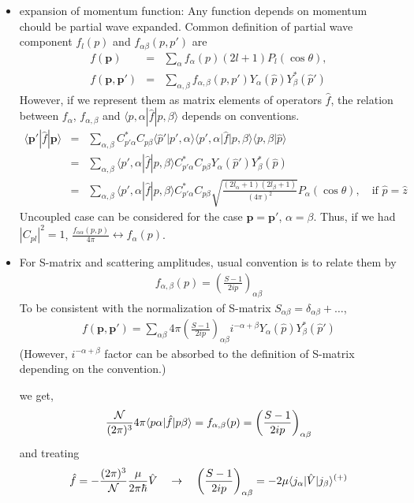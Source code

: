 \documentclass[10pt]{book}
\def\bm{\boldsymbol}
\newcommand{\bea}{\begin{eqnarray}}
\newcommand{\eea}{\end{eqnarray}}
\newcommand{\no}{\nonumber \\}
\def\vp{{\bm p}}
\def\la{\langle}
\def\ra{\rangle}
\begin{document}
\begin{itemize}
\item expansion of momentum function: Any function depends on momentum chould be partial wave expanded.
      Common definition of partial wave component $f_l(p)$ and $f_{\alpha\beta}(p,p')$ are
      \bea 
      f(\vp)&=&\sum_{\alpha} f_{\alpha}(p) (2l+1) P_l(\cos\theta) ,\no
      f(\vp,\vp')&=&\sum_{\alpha,\beta} f_{\alpha,\beta}(p,p') Y_\alpha(\hat{p}) Y^*_\beta(\hat{p}')   
      \eea 
      However, if we represent them as matrix elements of operators $\hat{f}$, 
      the relation between $f_{\alpha}$, $f_{\alpha,\beta}$ and $\la p,\alpha|\hat{f}|p,\beta\ra $
      depends on conventions.
      \bea 
      \la \vp'|\hat{f}|\vp\ra 
      &=&\sum_{\alpha,\beta} C^*_{p'\alpha} C_{p\beta}\la \hat{p}'|p',\alpha\ra\la p',\alpha|
                           \hat{f}|p,\beta\ra \la p,\beta|\hat{p}\ra \no 
      &=&\sum_{\alpha,\beta} \la p',\alpha|
                                 \hat{f}|p,\beta\ra 
                                C^*_{p'\alpha} C_{p\beta} 
                          Y_\alpha(\hat{p}') Y^*_{\beta}(\hat{p})\no
      &=&\sum_{\alpha,\beta} \la p',\alpha|
                                 \hat{f}|p,\beta\ra 
                                C^*_{p'\alpha} C_{p\beta} 
                          \sqrt{\frac{(2l_\alpha+1)(2l_\beta+1)}{(4\pi)^2}}
                          P_\alpha(\cos\theta),\quad \mbox{if }\hat{p}=\hat{z}
      \eea 
      Uncoupled case can be considered for the case $\vp=\vp'$, $\alpha=\beta$.
      Thus, if we had $|C_{pl}|^2=1$, 
      $\frac{f_{\alpha\alpha}(p,p)}{4\pi}\leftrightarrow f_\alpha(p)$.
      
      \item For S-matrix and scattering amplitudes, usual convention is to relate them by
      \bea 
      f_{\alpha,\beta}(p)=\left(\frac{S-1}{2ip}\right)_{\alpha\beta}
      \eea 
      To be consistent with the normalization of S-matrix $S_{\alpha\beta}=\delta_{\alpha\beta}+\dots$,
      \bea 
      \boxed{ 
      f(\vp, \vp')=\sum_{\alpha\beta} 4\pi
       \left(\frac{S-1}{2ip}\right)_{\alpha\beta}
      i^{-\alpha+\beta}
      Y_{\alpha}(\hat{p})Y_{\beta}^*(\hat{p}') }
      \eea 
      (However, $i^{-\alpha+\beta}$ factor can be absorbed to the 
      definition of S-matrix depending on the convention.)
      
      we get,
      \bea 
      \frac{\cal N}{(2\pi)^3} 4\pi \la p \alpha |\hat{f}|p \beta \ra 
      =f_{\alpha,\beta}(p)=\left(\frac{S-1}{2ip}\right)_{\alpha\beta}
      \eea 
      and treating
      \bea 
      \hat{f}=-\frac{(2\pi)^3}{\cal N}\frac{\mu}{2\pi\hbar}\hat{V}
      \quad\to\quad 
      \left(\frac{S-1}{2ip}\right)_{\alpha\beta}= -2\mu \la j_\alpha|\hat{V}|j_\beta\ra^{(+)} 
      \eea 
      

\end{itemize}
\end{document}
